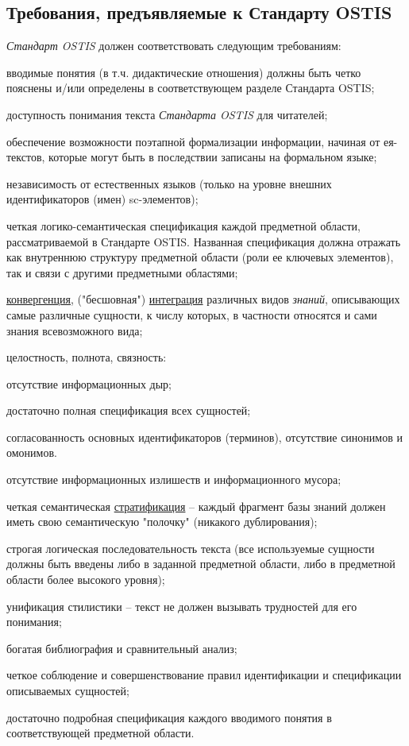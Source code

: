 \subsection{Требования, предъявляемые к Стандарту OSTIS}

\textit{Стандарт OSTIS} должен соответствовать следующим требованиям:
\begin{textitemize}
	\item вводимые понятия (в т.ч. дидактические отношения) должны быть четко пояснены и/или определены в соответствующем разделе Стандарта OSTIS;
	\item доступность понимания текста \textit{Стандарта OSTIS} для читателей;
	\item обеспечение возможности поэтапной формализации информации, начиная от ея-текстов, которые могут быть в последствии записаны на формальном языке;
	\item независимость от естественных языков (только на уровне внешних идентификаторов (имен) sc-элементов);
	\item четкая логико-семантическая спецификация каждой предметной области, рассматриваемой в Стандарте OSTIS. Названная спецификация должна отражать как внутреннюю структуру предметной области (роли ее ключевых элементов), так и связи с другими предметными областями;
	\item \uline{конвергенция}, ("бесшовная"{}) \uline{интеграция} различных видов \textit{знаний}, описывающих самые различные сущности, к числу которых, в частности относятся и сами знания всевозможного вида;
	\item целостность, полнота, связность:
	\begin{textitemize}
		\item отсутствие информационных дыр;
		\item достаточно полная спецификация всех сущностей;
		\item согласованность основных идентификаторов (терминов), отсутствие синонимов и омонимов.
	\end{textitemize}
	\item отсутствие информационных излишеств и информационного мусора;
	\item четкая семантическая \uline{стратификация} -- каждый фрагмент базы знаний должен иметь свою семантическую "полочку"{} (никакого дублирования);
	\item строгая логическая последовательность текста (все используемые сущности должны быть введены либо в заданной предметной области, либо в предметной области более высокого уровня);
	\item унификация стилистики -- текст не должен вызывать трудностей для его понимания;
	\item богатая библиография и сравнительный анализ;
	\item четкое соблюдение и совершенствование правил идентификации и спецификации описываемых сущностей;
	\item достаточно подробная спецификация каждого вводимого понятия в соответствующей предметной области.
\end{textitemize}


